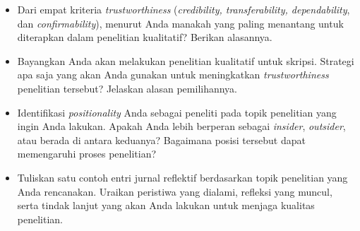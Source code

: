 \documentclass[
  indonesian,
  letterpaper,
  DIV=11,
  numbers=noendperiod]{scrreprt}
\providecommand{\tightlist}{%
  \setlength{\itemsep}{0pt}\setlength{\parskip}{0pt}}
\begin{document}
\begin{tcolorbox}[enhanced jigsaw, colframe=quarto-callout-important-color-frame, toptitle=1mm, breakable, leftrule=.75mm, arc=.35mm, toprule=.15mm, colback=white, colbacktitle=quarto-callout-important-color!10!white, bottomtitle=1mm, bottomrule=.15mm, titlerule=0mm, title=\textcolor{quarto-callout-important-color}{\faExclamation}\hspace{0.5em}{Refleksi \& Diskusi}, coltitle=black, left=2mm, opacitybacktitle=0.6, opacityback=0, rightrule=.15mm]

\begin{itemize}
\tightlist
\item
  Dari empat kriteria \emph{trustworthiness} (\emph{credibility,
  transferability, dependability}, dan \emph{confirmability}), menurut
  Anda manakah yang paling menantang untuk diterapkan dalam penelitian
  kualitatif? Berikan alasannya.
\item
  Bayangkan Anda akan melakukan penelitian kualitatif untuk skripsi.
  Strategi apa saja yang akan Anda gunakan untuk meningkatkan
  \emph{trustworthiness} penelitian tersebut? Jelaskan alasan
  pemilihannya.
\item
  Identifikasi \emph{positionality} Anda sebagai peneliti pada topik
  penelitian yang ingin Anda lakukan. Apakah Anda lebih berperan sebagai
  \emph{insider}, \emph{outsider}, atau berada di antara keduanya?
  Bagaimana posisi tersebut dapat memengaruhi proses penelitian?
\item
  Tuliskan satu contoh entri jurnal reflektif berdasarkan topik
  penelitian yang Anda rencanakan. Uraikan peristiwa yang dialami,
  refleksi yang muncul, serta tindak lanjut yang akan Anda lakukan untuk
  menjaga kualitas penelitian.
\end{itemize}

\end{tcolorbox}
\end{document}
